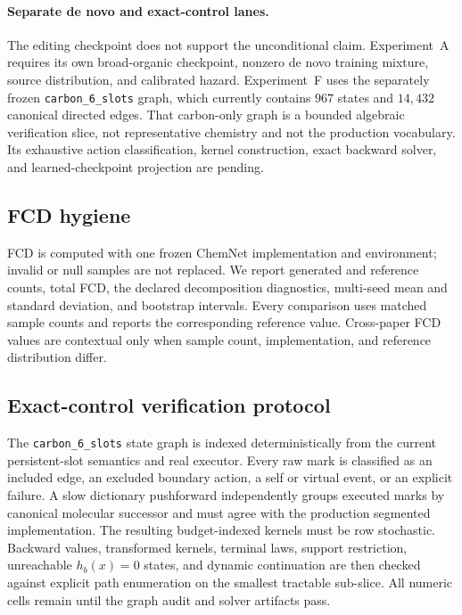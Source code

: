 \documentclass{article}
\theoremstyle{definition}
\theoremstyle{remark}
\begin{document}
\paragraph{Separate de novo and exact-control lanes.}
The editing checkpoint does not support the unconditional claim. Experiment~A requires its own broad-organic checkpoint, nonzero de novo training mixture, source distribution, and calibrated hazard. Experiment~F uses the separately frozen \texttt{carbon\_6\_slots} graph, which currently contains $967$ states and $14{,}432$ canonical directed edges. That carbon-only graph is a bounded algebraic verification slice, not representative chemistry and not the production vocabulary. Its exhaustive action classification, kernel construction, exact backward solver, and learned-checkpoint projection are pending.

\subsection{FCD hygiene}\label{app:fcd}

FCD is computed with one frozen ChemNet implementation and environment; invalid or null samples are not replaced. We report generated and reference counts, total FCD, the declared decomposition diagnostics, multi-seed mean and standard deviation, and bootstrap intervals. Every comparison uses matched sample counts and reports the corresponding reference value. Cross-paper FCD values are contextual only when sample count, implementation, and reference distribution differ.

\subsection{Exact-control verification protocol}\label{app:precedent}

The \texttt{carbon\_6\_slots} state graph is indexed deterministically from the current persistent-slot semantics and real executor. Every raw mark is classified as an included edge, an excluded boundary action, a self or virtual event, or an explicit failure. A slow dictionary pushforward independently groups executed marks by canonical molecular successor and must agree with the production segmented implementation. The resulting budget-indexed kernels must be row stochastic. Backward values, transformed kernels, terminal laws, support restriction, unreachable $h_b(x)=0$ states, and dynamic continuation are then checked against explicit path enumeration on the smallest tractable sub-slice. All numeric cells remain \XXX{} until the graph audit and solver artifacts pass.
\end{document}
